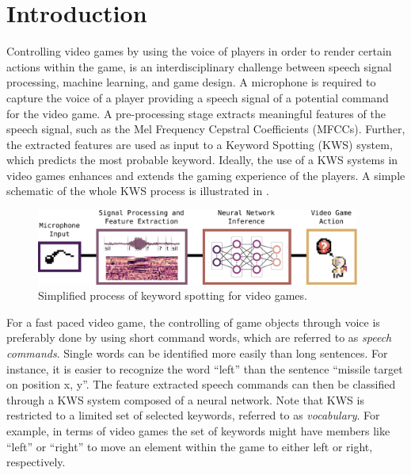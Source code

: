 
\chapter{Introduction}\label{sec:intro}
Controlling video games by using the voice of players in order to render certain actions within the game, is an interdisciplinary challenge between speech signal processing, machine learning, and game design.
A microphone is required to capture the voice of a player providing a speech signal of a potential command for the video game.
A pre-processing stage extracts meaningful features of the speech signal, such as the Mel Frequency Cepstral Coefficients (MFCCs).
Further, the extracted features are used as input to a Keyword Spotting (KWS) system, which predicts the most probable keyword.
Ideally, the use of a KWS systems in video games enhances and extends the gaming experience of the players.
A simple schematic of the whole KWS process is illustrated in .
\begin{figure}[!ht]
  \centering
    \includegraphics[width=0.95\textwidth]{./1_intro/figs/intro_kws.pdf}
  \caption{Simplified process of keyword spotting for video games.}
  \label{fig:intro_kws}
\end{figure}
\FloatBarrier
\noindent
For a fast paced video game, the controlling of game objects through voice is preferably done by using short command words, which are referred to as \emph{speech commands}.
Single words can be identified more easily than long sentences.
For instance, it is easier to recognize the word \enquote{left} than the sentence \enquote{missile target on position x, y}.
The feature extracted speech commands can then be classified through a KWS system composed of a neural network.
Note that KWS is restricted to a limited set of selected keywords, referred to as \emph{vocabulary}.
For example, in terms of video games the set of keywords might have members like \enquote{left} or \enquote{right} to move an element within the game to either left or right, respectively.
